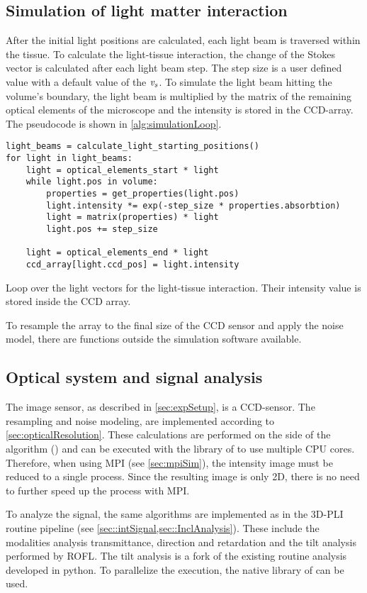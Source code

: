 \subsection{Simulation of light matter interaction}\label{sec:simLightTissue}
%
After the initial light positions are calculated, each light beam is traversed within the tissue.
To calculate the light-tissue interaction, the change of the Stokes vector is calculated after each light beam step.
The step size is a user defined value with a default value of the \Voxelsize{} $\textnormal{$\mathit{v_{s}}$}$.
To simulate the light beam hitting the volume's boundary, the light beam is multiplied by the matrix of the remaining optical elements of the microscope and the intensity is stored in the \ac{CCD}-array.
The pseudocode is shown in \cref{alg:simulationLoop}.
%
\begin{lstfloat}[!tb]
\lstset{style=python}
\begin{lstlisting}[]
light_beams = calculate_light_starting_positions()
for light in light_beams:
    light = optical_elements_start * light
    while light.pos in volume:
        properties = get_properties(light.pos)
        light.intensity *= exp(-step_size * properties.absorbtion)
        light = matrix(properties) * light
        light.pos += step_size
    
    light = optical_elements_end * light
    ccd_array[light.ccd_pos] = light.intensity
\end{lstlisting}
\caption[]{Loop over the light vectors for the light-tissue interaction. Their intensity value is stored inside the \ac{CCD} array.}
\label{alg:simulationLoop}
\end{lstfloat}
%
To resample the array to the final size of the \ac{CCD} sensor and apply the noise model, there are \python{} functions outside the simulation software available.
%
%
%
\subsection{Optical system and signal analysis}
\label{sec:ccdOptic}
%
The image sensor, as described in \cref{sec:expSetup}, is a \ac{CCD}-sensor.
The resampling and noise modeling, are implemented according to \cref{sec:opticalResolution}.
These calculations are performed on the \python{} side of the algorithm () and can be executed with the  library of \python{} to use multiple \ac{CPU} cores.
Therefore, when using \ac{MPI} (see \cref{sec:mpiSim}), the intensity image must be reduced to a single process.
Since the resulting image is only 2D, there is no need to further speed up the process with \ac{MPI}.
\par
%
To analyze the signal, the same algorithms are implemented as in the \ac{3D-PLI} routine pipeline (see \cref{sec::intSignal,sec::InclAnalysis}).
These include the modalities analysis transmittance, direction and retardation and the tilt analysis performed by \ac{ROFL}.
The tilt analysis is a fork of the existing routine analysis developed in python.
To parallelize the execution, the native  library of \python{} can be used.
%
%
%

